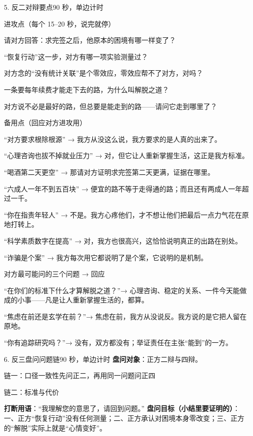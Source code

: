\documentclass[script,con]{debate}
\begin{document}
\begin{stage}{5. 反二对辩要点}{90 秒，单边计时}
\begin{points}{进攻点（每个 15–20 秒，说完就停）}
\item 请对方回答：求完签之后，他原本的困境有哪一样变了？
\item “恢复行动”这一步，对方有哪一项实验测量过？
\item 对方念的“没有统计关联”是个零效应，零效应帮不了对方，对吗？
\item 一条要每年续费才能走下去的路，为什么叫解脱之道？
\item 对方说不必是最好的路，但总要是能走到的路——请问它走到哪里了？
\end{points}
\begin{points}{备用点（回应对方进攻用）}
\item “对方要求根除根源” → 我方从没这么说，我方要求的是人真的出来了。
\item “心理咨询也拔不掉就业压力” → 对，但它让人重新掌握生活，这正是我方标准。
\item “喝酒第二天更空” → 那请对方证明求完签第二天更满，证据在哪里。
\item “六成人一年不到五百块” → 便宜的路不等于走得通的路；而且还有两成人一年超过一千。
\item “你在指责年轻人” → 不是。我方心疼他们，才不想让他们把最后一点力气花在原地打转上。
\item “科学素质数字在提高” → 对，我方也很高兴，这恰恰说明真正的出路在别处。
\item “诈骗是个案” → 我方每次用它都说明了是个案，它说明的是机制。
\end{points}
\begin{points}{对方最可能问的三个问题 → 回应}
\item “在你们的标准下什么才算解脱之道？”→ 心理咨询、稳定的关系、一件今天能做成的小事——凡是让人重新掌握生活的，都算。
\item “焦虑在前还是玄学在前？”→ 焦虑在前，我方从没说反。我方说的是它把人留在原地。
\item “你有追踪研究吗？”→ 没有，双方都没有；举证责任在主张“能到”的一方。
\end{points}
\end{stage}
\begin{stage}{6. 反三盘问问题链}{90 秒，单边计时}
\textbf{盘问对象}：正方二辩与四辩。
\begin{chain}{链一：口径一致性}{先问正二，再用同一问题问正四}
\end{chain}
\begin{chain}{链二：标准与代价}{}
\end{chain}
\textbf{打断用语}：“我理解您的意思了，请回到问题。”
\textbf{盘问目标（小结里要证明的）}：一、正方“恢复行动”没有任何测量；二、正方承认对困境本身零改变；三、正方的“解脱”实际上就是“心情变好”。
\end{stage}
\end{document}
